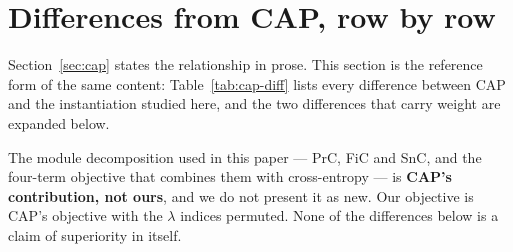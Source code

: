 %
%
%
%
\appendix

\section{Differences from CAP, row by row}
\label{sec:appendix}
\label{sec:app:cap}

Section~\ref{sec:cap} states the relationship in prose. This section is the
reference form of the same content: Table~\ref{tab:cap-diff} lists every
difference between CAP \citep{xu2022cap} and the instantiation studied here, and
the two differences that carry weight are expanded below.

The module decomposition used in this paper --- PrC, FiC and SnC, and the
four-term objective that combines them with cross-entropy --- is \textbf{CAP's
contribution, not ours}, and we do not present it as new. Our objective is CAP's
objective with the $\lambda$ indices permuted. None of the differences below is a
claim of superiority in itself.

